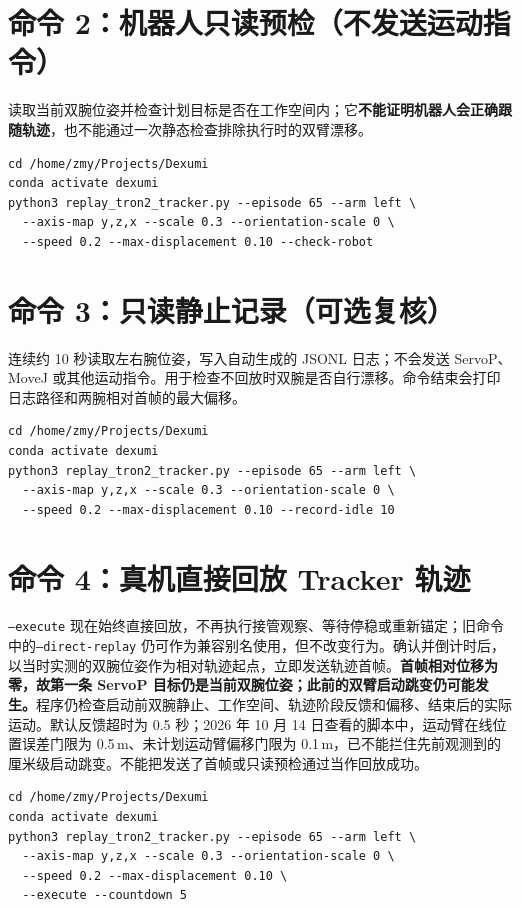 \documentclass[UTF8,a4paper,11pt]{ctexart}
\begin{document}
\section*{命令 2：机器人只读预检（不发送运动指令）}

读取当前双腕位姿并检查计划目标是否在工作空间内；它\textbf{不能证明机器人会正确跟随轨迹}，也不能通过一次静态检查排除执行时的双臂漂移。

\begin{verbatim}
cd /home/zmy/Projects/Dexumi
conda activate dexumi
python3 replay_tron2_tracker.py --episode 65 --arm left \
  --axis-map y,z,x --scale 0.3 --orientation-scale 0 \
  --speed 0.2 --max-displacement 0.10 --check-robot
\end{verbatim}

\section*{命令 3：只读静止记录（可选复核）}

连续约 10 秒读取左右腕位姿，写入自动生成的 JSONL 日志；不会发送 ServoP、MoveJ 或其他运动指令。用于检查不回放时双腕是否自行漂移。命令结束会打印日志路径和两腕相对首帧的最大偏移。

\begin{verbatim}
cd /home/zmy/Projects/Dexumi
conda activate dexumi
python3 replay_tron2_tracker.py --episode 65 --arm left \
  --axis-map y,z,x --scale 0.3 --orientation-scale 0 \
  --speed 0.2 --max-displacement 0.10 --record-idle 10
\end{verbatim}

\section*{命令 4：真机直接回放 Tracker 轨迹}

\texttt{--execute} 现在始终直接回放，不再执行接管观察、等待停稳或重新锚定；旧命令中的\texttt{--direct-replay} 仍可作为兼容别名使用，但不改变行为。确认并倒计时后，以当时实测的双腕位姿作为相对轨迹起点，立即发送轨迹首帧。\textbf{首帧相对位移为零，故第一条 ServoP 目标仍是当前双腕位姿；此前的双臂启动跳变仍可能发生。}程序仍检查启动前双腕静止、工作空间、轨迹阶段反馈和偏移、结束后的实际运动。默认反馈超时为 0.5 秒；2026 年 10 月 14 日查看的脚本中，运动臂在线位置误差门限为 0.5\,m、未计划运动臂偏移门限为 0.1\,m，已不能拦住先前观测到的厘米级启动跳变。不能把发送了首帧或只读预检通过当作回放成功。

\begin{verbatim}
cd /home/zmy/Projects/Dexumi
conda activate dexumi
python3 replay_tron2_tracker.py --episode 65 --arm left \
  --axis-map y,z,x --scale 0.3 --orientation-scale 0 \
  --speed 0.2 --max-displacement 0.10 \
  --execute --countdown 5
\end{verbatim}
\end{document}
